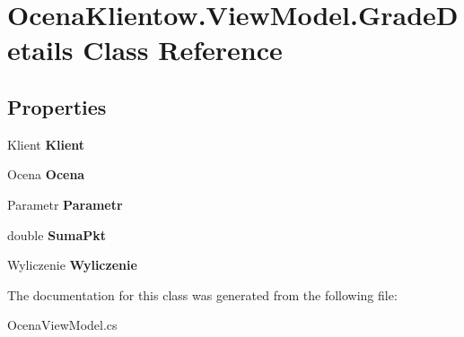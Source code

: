 \hypertarget{class_ocena_klientow_1_1_view_model_1_1_grade_details}{}\section{Ocena\+Klientow.\+View\+Model.\+Grade\+Details Class Reference}
\label{class_ocena_klientow_1_1_view_model_1_1_grade_details}
\subsection*{Properties}
\begin{DoxyCompactItemize}
\item 
\hypertarget{class_ocena_klientow_1_1_view_model_1_1_grade_details_ad73764e4925b4a551770d6a70782fc04}{}\label{class_ocena_klientow_1_1_view_model_1_1_grade_details_ad73764e4925b4a551770d6a70782fc04} 
Klient {\bfseries Klient}
\item 
\hypertarget{class_ocena_klientow_1_1_view_model_1_1_grade_details_aececb2886d6c592db17b4eaca3579ace}{}\label{class_ocena_klientow_1_1_view_model_1_1_grade_details_aececb2886d6c592db17b4eaca3579ace} 
Ocena {\bfseries Ocena}
\item 
\hypertarget{class_ocena_klientow_1_1_view_model_1_1_grade_details_a43f2eb669c617697e0c97734381f0979}{}\label{class_ocena_klientow_1_1_view_model_1_1_grade_details_a43f2eb669c617697e0c97734381f0979} 
Parametr {\bfseries Parametr}
\item 
\hypertarget{class_ocena_klientow_1_1_view_model_1_1_grade_details_ada7ff4389e34824988b2df2f7c1f1ac7}{}\label{class_ocena_klientow_1_1_view_model_1_1_grade_details_ada7ff4389e34824988b2df2f7c1f1ac7} 
double {\bfseries Suma\+Pkt}
\item 
\hypertarget{class_ocena_klientow_1_1_view_model_1_1_grade_details_ab29acf4c91dedda60c5b583f2d3c063b}{}\label{class_ocena_klientow_1_1_view_model_1_1_grade_details_ab29acf4c91dedda60c5b583f2d3c063b} 
Wyliczenie {\bfseries Wyliczenie}
\end{DoxyCompactItemize}


The documentation for this class was generated from the following file\+:\begin{DoxyCompactItemize}
\item 
Ocena\+View\+Model.\+cs\end{DoxyCompactItemize}
